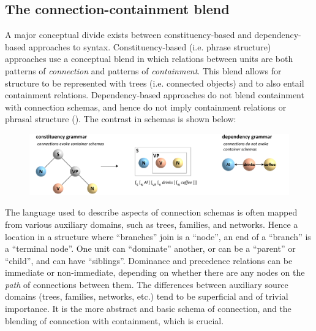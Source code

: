 \subsection{The connection-containment blend}

A major conceptual divide exists between constituency-based and dependency-based approaches to syntax. Constituency-based (i.e. phrase structure) approaches use a conceptual blend in which relations between units are both patterns of \textit{connection} and patterns of \textit{containment}. This blend allows for structure to be represented with trees (i.e. connected objects) and to also entail containment relations. Dependency-based approaches do not blend containment with connection schemas, and hence do not imply containment relations or phrasal structure (\citealt{Hays1964,Melʹčuk1988,Osborne2006,OsborneEtAl2011,Percival1990,Tesnière2018}). The contrast in schemas is shown below: 

  
\begin{figure}
\includegraphics[width=\textwidth]{figures/Tilsen-img34.png}
\caption{\missingcaption}
\label{fig:3:6}
\end{figure}
 

  The language used to describe aspects of connection schemas is often mapped from various auxiliary domains, such as trees, families, and networks. Hence a location in a structure where “branches” join is a “node”, an end of a “branch” is a “terminal node”. One unit can “dominate” another, or can be a “parent” or “child”, and can have “siblings”. Dominance and precedence relations can be immediate or non-immediate, depending on whether there are any nodes on the \textit{path} of connections between them. The differences between auxiliary source domains (trees, families, networks, etc.) tend to be superficial and of trivial importance. It is the more abstract and basic schema of connection, and the blending of connection with containment, which is crucial.   

